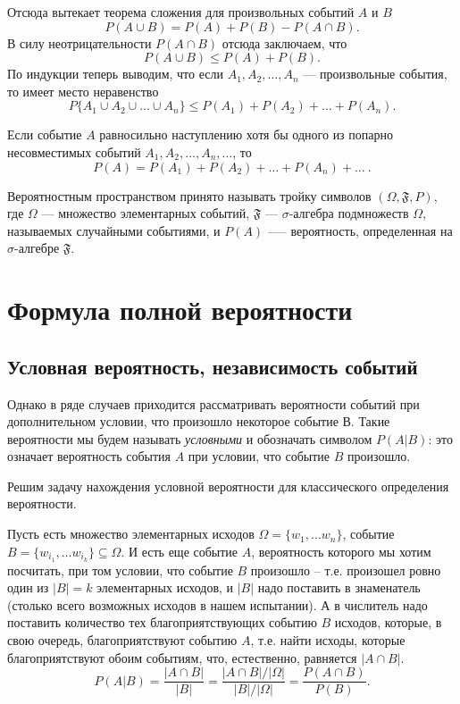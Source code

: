 Отсюда вытекает теорема сложения для произвольных событий $A$ и $B$
$$
P(A \cup B) = P(A) + P(B) - P(A\cap B).
$$
В силу неотрицательности $P(A\cap B)$ отсюда заключаем, что
$$
P(A \cup B) \le P(A) + P(B).
$$
По индукции теперь выводим, что если $A_1,A_2, \ldots,A_n$ --- произвольные события, то имеет место неравенство
$$
P\{ A_1 \cup A_2 \cup \ldots \cup A_n \} \le P(A_1) + P(A_2) + \ldots + P(A_n).
$$
\begin{axiome}
 Если событие $A$ равносильно наступлению хотя бы одного из попарно несовместимых событий $A_1,A_2,\ldots,A_n,\ldots$, то
$$
P(A) = P(A_1) + P(A_2) + \ldots + P(A_n) + \ldots \: .
$$
\end{axiome}
Вероятностным пространством принято называть тройку символов $(\Omega, \mathfrak{F}, P)$, где $\Omega$ --- множество элементарных событий, $\mathfrak{F}$ — $\sigma$-алгебра подмножеств $\Omega$, называемых случайными событиями, и $P(A)$ --— вероятность, определенная на $\sigma$-алгебре $\mathfrak{F}$.

\section{Формула полной вероятности}
\subsection{Условная вероятность, независимость событий}

Однако в ряде случаев приходится рассматривать вероятности событий при дополнительном условии, что произошло некоторое событие В. Такие вероятности мы будем называть \textit{условными} и обозначать символом $P(A|B)$: это означает вероятность события $A$ при условии, что событие $B$ произошло.
 
Решим задачу нахождения условной вероятности для классического определения вероятности.

Пусть есть множество элементарных исходов $\Omega=\{w_1,\dots w_n\}$, событие $B=\{w_{i_1},\dots w_{i_k}\} \subseteq \Omega$. И есть еще событие $A$, вероятность которого мы хотим посчитать, при том условии, что событие $B$ произошло -- т.е. произошел ровно один из $|B|=k$ элементарных исходов, и $|B|$ надо поставить в знаменатель (столько всего возможных исходов в нашем испытании). А в числитель надо поставить количество тех благоприятствующих событию $B$ исходов, которые, в свою очередь, благоприятствуют событию $A$, т.е. найти исходы, которые благоприятствуют обоим событиям, что, естественно, равняется $|A\cap B|$.
\begin{equation} \label{ch30.2eq1}
P(A|B) = \frac{|A\cap B|}{|B|} = \frac{|A\cap B|/|\Omega|}{|B|/|\Omega|} = \frac{P(A\cap B)}{P(B)}.
\end{equation}

